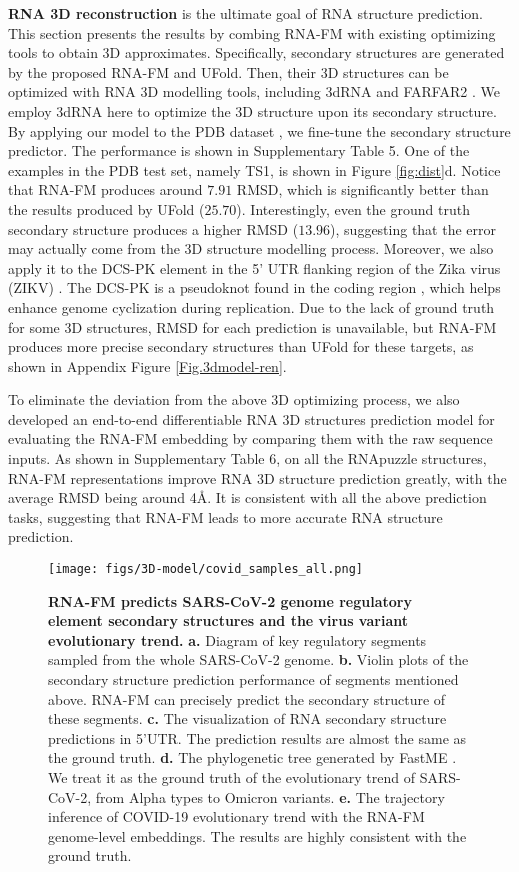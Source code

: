 \textbf{RNA 3D reconstruction} is the ultimate goal of RNA structure prediction. This section presents the results by combing RNA-FM with existing optimizing tools to obtain 3D approximates. Specifically, secondary structures are generated by the proposed RNA-FM and UFold. Then, their 3D structures can be optimized with RNA 3D modelling tools, including 3dRNA and FARFAR2 \cite{watkins2020farfar2}. We employ 3dRNA here to optimize the 3D structure upon its secondary structure.  
By applying our model to the PDB dataset \cite{singh2019rna}, we fine-tune the secondary structure predictor. The performance is shown in Supplementary Table 5. One of the examples in the PDB test set, namely TS1, is shown in Figure \ref{fig:dist}d. Notice that RNA-FM produces around $7.91$ RMSD, which is significantly better than the results produced by UFold ($25.70$). Interestingly, even the ground truth secondary structure produces a higher RMSD ($13.96$), suggesting that the error may actually come from the 3D structure modelling process. 
Moreover, we also apply it to the DCS-PK element in the 5' UTR flanking region of the Zika virus (ZIKV) \cite{li2018integrative}. The DCS-PK is a pseudoknot found in the coding region \cite{liu2013novel}, which helps enhance genome cyclization during replication. Due to the lack of ground truth for some 3D structures, RMSD for each prediction is unavailable, but RNA-FM produces more precise secondary structures than UFold for these targets, as shown in Appendix  Figure \ref{Fig.3dmodel-ren}.


To eliminate the deviation from the above 3D optimizing process, we also developed an end-to-end differentiable RNA 3D structures prediction model for evaluating the RNA-FM embedding by comparing them with the raw sequence inputs. 
As shown in Supplementary Table 6, on all the RNApuzzle structures, RNA-FM representations improve RNA 3D structure prediction greatly, with the average RMSD being around 4\AA{}.
It is consistent with all the above prediction tasks, suggesting that RNA-FM leads to more accurate RNA structure prediction.




\begin{figure}[htbp] %
\centering
\texttt{[image: figs/3D-model/covid\_samples\_all.png]} 
\caption{\textbf{RNA-FM predicts SARS-CoV-2 genome regulatory element secondary structures and the virus variant evolutionary trend.} \textbf{a.} Diagram of key regulatory segments sampled from the whole SARS-CoV-2 genome. \textbf{b.} Violin plots of the secondary structure prediction performance of segments mentioned above. RNA-FM can precisely predict the secondary structure of these segments. \textbf{c.} The visualization of RNA secondary structure predictions in 5'UTR. The prediction results are almost the same as the ground truth. \textbf{d.} The phylogenetic tree generated by FastME \cite{desper2002fast}. We treat it as the ground truth of the evolutionary trend of SARS-CoV-2, from Alpha types to Omicron variants. \textbf{e.} The trajectory inference of COVID-19 evolutionary trend with the RNA-FM genome-level embeddings. The results are highly consistent with the ground truth.}
\label{Fig.covid}
\end{figure}

